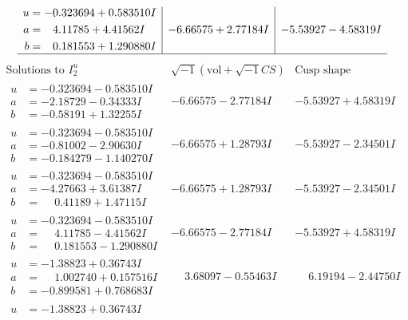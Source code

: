 \documentclass[1p]{elsarticle_modified}
\theoremstyle{definition}
\newcommand{\I}{\sqrt{-1}}
\begin{document}
$$\begin{array}{c|c|c}
\begin{aligned}
u &= -0.323694 + 0.583510 I \\
a &= \phantom{-}4.11785 + 4.41562 I \\
b &= \phantom{-}0.181553 + 1.290880 I\end{aligned}
 & -6.66575 + 2.77184 I & -5.53927 - 4.58319 I\\
 \hline 
 \end{array}$$\newpage$$\begin{array}{c|c|c}  
\text{Solutions to }I^u_{2}& \I (\text{vol} + \sqrt{-1}CS) & \text{Cusp shape}\\
 \hline 
\begin{aligned}
u &= -0.323694 - 0.583510 I \\
a &= -2.18729 - 0.34333 I \\
b &= -0.58191 + 1.32255 I\end{aligned}
 & -6.66575 - 2.77184 I & -5.53927 + 4.58319 I \\ \hline\begin{aligned}
u &= -0.323694 - 0.583510 I \\
a &= -0.81002 - 2.90630 I \\
b &= -0.184279 - 1.140270 I\end{aligned}
 & -6.66575 + 1.28793 I & -5.53927 - 2.34501 I \\ \hline\begin{aligned}
u &= -0.323694 - 0.583510 I \\
a &= -4.27663 + 3.61387 I \\
b &= \phantom{-}0.41189 + 1.47115 I\end{aligned}
 & -6.66575 + 1.28793 I & -5.53927 - 2.34501 I \\ \hline\begin{aligned}
u &= -0.323694 - 0.583510 I \\
a &= \phantom{-}4.11785 - 4.41562 I \\
b &= \phantom{-}0.181553 - 1.290880 I\end{aligned}
 & -6.66575 - 2.77184 I & -5.53927 + 4.58319 I \\ \hline\begin{aligned}
u &= -1.38823 + 0.36743 I \\
a &= \phantom{-}1.002740 + 0.157516 I \\
b &= -0.899581 + 0.768683 I\end{aligned}
 & \phantom{-}3.68097 - 0.55463 I & \phantom{-}6.19194 - 2.44750 I \\ \hline\begin{aligned}
u &= -1.38823 + 0.36743 I \\

\end{aligned}
\end{array}$$
\end{document}
